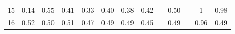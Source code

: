 \documentclass[twoside,11pt]{article}
\begin{document}
\begin{table}[H]
{\begin{tabular}{cccccccclclcc}
\multicolumn{1}{|c|}{15}                                                                          & \multicolumn{1}{c|}{0.14}                                                           & \multicolumn{1}{c|}{\cellcolor[HTML]{FFCCC9}0.55}                                              & \multicolumn{1}{c|}{0.41}                                                                & \multicolumn{1}{c|}{0.33}                                                                & \multicolumn{1}{c|}{0.40}                                                                & \multicolumn{1}{c|}{0.38}                                                                   & \multicolumn{1}{c|}{0.42}                                                                   & \multicolumn{1}{l|}{}                                                                          & \multicolumn{1}{c|}{\cellcolor[HTML]{ECF4FF}0.50}                                           & \multicolumn{1}{l|}{}                    & \multicolumn{1}{c|}{\cellcolor[HTML]{67FD9A}1}                                                 & \multicolumn{1}{c|}{0.98}                                                                      \\ \cline{1-1}
\multicolumn{1}{|c|}{16}                                                                          & \multicolumn{1}{c|}{0.52}                                                           & \multicolumn{1}{c|}{\cellcolor[HTML]{ECF4FF}0.50}                                              & \multicolumn{1}{c|}{\cellcolor[HTML]{FFCCC9}0.51}                                        & \multicolumn{1}{c|}{0.47}                                                                & \multicolumn{1}{c|}{0.49}                                                                & \multicolumn{1}{c|}{0.49}                                                                   & \multicolumn{1}{c|}{0.45}                                                                   & \multicolumn{1}{l|}{}                                                                          & \multicolumn{1}{c|}{0.49}                                                                   & \multicolumn{1}{l|}{}                    & \multicolumn{1}{c|}{\cellcolor[HTML]{67FD9A}0.96}                                              & \multicolumn{1}{c|}{0.49}                                                                      \\ \cline{1-1}

\end{tabular}}
\end{table}
\end{document}
